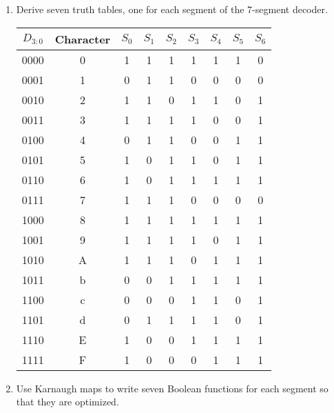 \documentclass{article}
\begin{document}
\begin{enumerate}
\item Derive seven truth tables, one for each segment of the 7-segment decoder.

\begin{table}[ht!]
\small
\centering
\begin{tabular}{c|c|ccccccc}
$D_{3:0}$& Character & $S_0$ & $S_1$ & $S_2$ & $S_3$ & $S_4$ & $S_5$ & $S_6$\\
\hline
0000 & 0 & 1 & 1 & 1 & 1 & 1 & 1 & 0\\
0001 & 1 & 0 & 1 & 1 & 0 & 0 & 0 & 0\\
0010 & 2 & 1 & 1 & 0 & 1 & 1 & 0 & 1\\
0011 & 3 & 1 & 1 & 1 & 1 & 0 & 0 & 1\\
0100 & 4 & 0 & 1 & 1 & 0 & 0 & 1 & 1\\
0101 & 5 & 1 & 0 & 1 & 1 & 0 & 1 & 1\\
0110 & 6 & 1 & 0 & 1 & 1 & 1 & 1 & 1\\
0111 & 7 & 1 & 1 & 1 & 0 & 0 & 0 & 0\\
1000 & 8 & 1 & 1 & 1 & 1 & 1 & 1 & 1\\
1001 & 9 & 1 & 1 & 1 & 1 & 0 & 1 & 1\\
1010 & A & 1 & 1 & 1 & 0 & 1 & 1 & 1\\
1011 & b & 0 & 0 & 1 & 1 & 1 & 1 & 1\\
1100 & c & 0 & 0 & 0 & 1 & 1 & 0 & 1\\
1101 & d & 0 & 1 & 1 & 1 & 1 & 0 & 1\\
1110 & E & 1 & 0 & 0 & 1 & 1 & 1 & 1\\
1111 & F & 1 & 0 & 0 & 0 & 1 & 1 & 1\\
\end{tabular}
\end{table}

\item Use Karnaugh maps to write seven Boolean functions for each segment so that they are optimized.


\end{enumerate}
\end{document}
